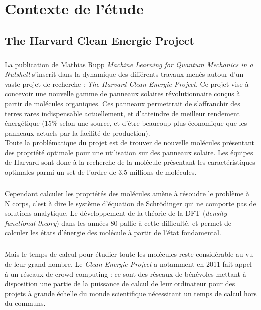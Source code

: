 \documentclass[a4paper,12pt,titlepage]{report}
\begin{document}
\chapter{Contexte de l'étude}
\section{The Harvard Clean Energie Project}
\paragraph{}
La publication de Mathias Rupp \textit{Machine Learning for Quantum Mechanics in a Nutshell} s'inscrit dans la dynamique des différents travaux menés autour d'un vaste projet de recherche : \textit{The Harvard Clean Energie Project}. Ce projet vise à concevoir une nouvelle gamme de panneaux solaires révolutionnaire conçus à partir de molécules organiques. Ces panneaux permettrait de s'affranchir des terres rares indispensable actuellement, et d'atteindre de meilleur rendement énergétique (15\% selon une source, et d'être beaucoup plus économique que les panneaux actuels par la facilité de production).\\
Toute la problématique du projet est de trouver de nouvelle molécules présentant des propriété optimale pour une utilisation sur des panneaux solaire. 
Les équipes de Harvard sont donc à la recherche de la molécule présentant les caractéristiques optimales parmi un set de l'ordre de 3.5 millions de molécules.
\paragraph{}
Cependant calculer les propriétés des molécules amène à résoudre le problème à N corps, c'est à dire le système d'équation de Schrödinger qui ne comporte pas de solutions analytique. 
Le développement de la théorie de la DFT (\textit{density functional theory}) dans les années 80 pallie à cette difficulté, et permet de calculer les états d'énergie des molécule à partir de l'état fondamental. 
\paragraph{}
Mais le temps de calcul pour étudier toute les molécules reste considérable au vu de leur grand nombre. Le \textit{Clean Energie Project} a notamment en 2011 fait appel à un réseaux de crowd computing : ce sont des réseaux de bénévoles mettant à disposition une partie de la puissance de calcul de leur ordinateur pour des projets à grande échelle du monde scientifique nécessitant un temps de calcul hors du communs.  
\end{document}
